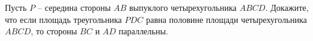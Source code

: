 \begin{ex}
	\begin{condition}
		Пусть \( P \) – середина стороны \( AB  \) выпуклого четырехугольника \( ABCD \). Докажите, что если площадь треугольника \( PDC  \) равна половине площади четырехугольника \( ABCD \), то стороны \( BC  \) и \( AD  \) параллельны.
	\end{condition}
\end{ex}